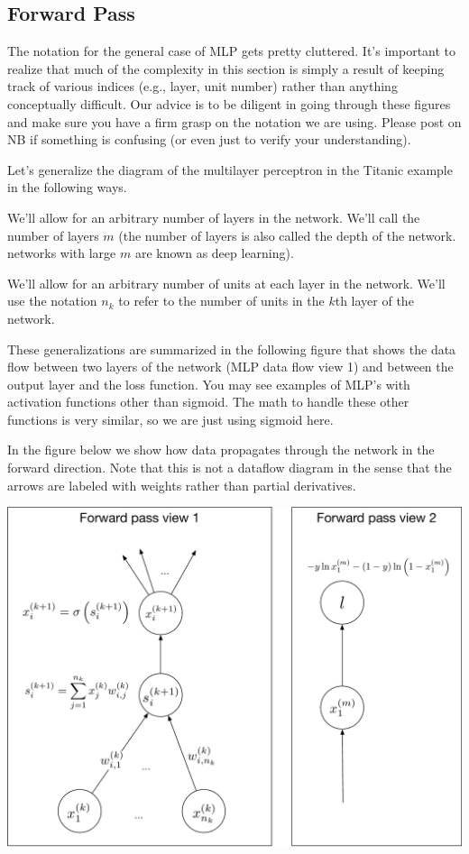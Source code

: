 \documentclass[assignment06_Solutions]{subfiles}
\begin{document}
\subsection{Forward Pass}
\begin{notice}
The notation for the general case of MLP gets pretty cluttered. It's important to realize that much of the complexity in this section is simply a result of keeping track of various indices (e.g., layer, unit number) rather than anything conceptually difficult.  Our advice is to be diligent in going through these figures and make sure you have a firm grasp on the notation we are using.  Please post on NB if something is confusing (or even just to verify your understanding).
\end{notice}

Let's generalize the diagram of the multilayer perceptron in the Titanic example in the following ways.
\be
\item We'll allow for an arbitrary number of layers in the network.  We'll call the number of layers $m$ (the number of layers is also called the depth of the network.  networks with large $m$ are known as deep learning).
\item We'll allow for an arbitrary number of units at each layer in the network.  We'll use the notation $n_k$ to refer to the number of units in the $k$th layer of the network.
\ee

These generalizations are summarized in the following figure that shows the data flow between two layers of the network (MLP data flow view 1) and between the output layer and the loss function.  You may see examples of MLP's with activation functions other than sigmoid.  The math to handle these other functions is very similar, so we are just using sigmoid here.

In the figure below we show how data propagates through the network in the forward direction.  Note that this is not a dataflow diagram in the sense that the arrows are labeled with weights rather than partial derivatives.

\includegraphics[width=\linewidth]{figures/mlpfullforward}
\end{document}
